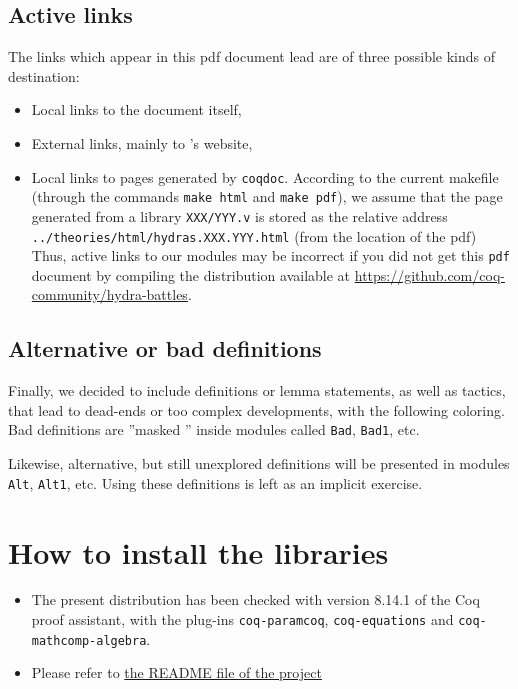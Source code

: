 \documentclass[twoside,a4paper]{book}
\newcounter{snippets}
\begin{document}
\subsection{Active links}
The  links which appear in this pdf  document lead are of three possible kinds of destination:
\begin{itemize}
\item Local links to the document itself,
\item External links, mainly to \coq's website,
\item Local links to pages generated by \texttt{coqdoc}. According to the current makefile (through the commands \texttt{make html} and \texttt{make pdf}), 
  we assume that the page generated from a library \texttt{XXX/YYY.v} is stored as
the relative address \texttt{../theories/html/hydras.XXX.YYY.html} (from the location of the pdf)
Thus,  active links to our \coq{} modules may be incorrect if you did not get this \texttt{pdf} document by compiling the distribution available at
\url{https://github.com/coq-community/hydra-battles}.

\end{itemize}

\subsection{Alternative or bad definitions}
\label{sect:alt-proofs}
Finally, we decided to include definitions or lemma statements, as well as tactics,  that lead to
dead-ends or too complex developments, with the following coloring.
Bad definitions 
 are ''masked '' inside modules called \texttt{Bad}, \texttt{Bad1}, etc.





Likewise, alternative, but still unexplored definitions will be presented in modules
\texttt{Alt}, \texttt{Alt1}, etc. Using these definitions is left as an implicit exercise.





\section{How to install the libraries}
\label{sec:orgheadline4}
\begin{itemize}
\item The present distribution has been checked with version 8.14.1 of the Coq proof assistant, with the plug-ins \texttt{coq-paramcoq}, \texttt{coq-equations}
and \texttt{coq-mathcomp-algebra}.

\item Please refer to \href{https://github.com/coq-community/hydra-battles#readme}{the README file of the project}
\end{itemize}
\end{document}
